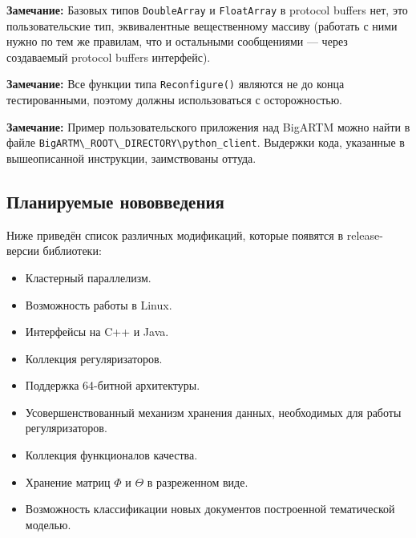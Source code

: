 {\bf Замечание:} Базовых типов \verb'DoubleArray' и \verb'FloatArray' в protocol buffers нет, это пользовательские тип, эквивалентные вещественному массиву (работать с ними нужно по тем же правилам, что и остальными сообщениями --- через создаваемый protocol buffers интерфейс).

{\bf Замечание:} Все функции типа \verb|Reconfigure()| являются не до конца тестированными, поэтому должны использоваться с осторожностью.

{\bf Замечание:} Пример пользовательского приложения над BigARTM можно найти в файле \verb|BigARTM\_ROOT\_DIRECTORY\python_client|. Выдержки кода, указанные в вышеописанной инструкции, заимствованы оттуда.

\subsection{Планируемые нововведения}

Ниже приведён список различных модификаций, которые появятся в release-версии библиотеки:

\begin{itemize}
	\item Кластерный параллелизм.
	\item Возможность работы в Linux.
	\item Интерфейсы на C++ и Java.
	\item Коллекция регуляризаторов.
	\item Поддержка 64-битной архитектуры.
	\item Усовершенствованный механизм хранения данных, необходимых для работы регуляризаторов.
	\item Коллекция функционалов качества.
	\item Хранение матриц $\Phi$ и $\Theta$ в разреженном виде.
	\item Возможность классификации новых документов построенной тематической моделью.
\end{itemize}